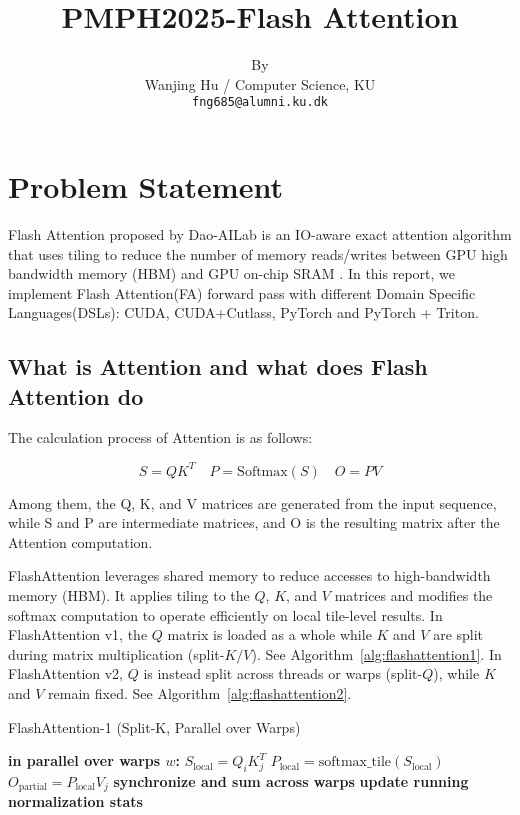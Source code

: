 \documentclass[11pt]{article}
\title{PMPH2025-Flash Attention}
\author{By \\
  Wanjing Hu / Computer Science, KU  \\
  \texttt{fng685@alumni.ku.dk} \\}
\renewcommand\cite{\citep}  %
\begin{document}
\maketitle

\section{Problem Statement}

Flash Attention proposed by Dao-AILab is an IO-aware exact attention algorithm that uses tiling to reduce the number of memory reads/writes between GPU high bandwidth memory (HBM) and GPU on-chip SRAM\cite{dao2022flashattention} \cite{dao2023flashattention}. In this report, we implement Flash Attention(FA) forward pass with different Domain Specific Languages(DSLs): CUDA, CUDA+Cutlass, PyTorch and PyTorch + Triton.

\subsection{What is Attention and what does Flash Attention do}
The calculation process of Attention is as follows:

\[
S = QK^{T} \quad P = \text{Softmax}(S) \quad O = PV
\]

Among them, the Q, K, and V matrices are generated from the input sequence, while S and P are intermediate matrices, and O is the resulting matrix after the Attention computation.

FlashAttention leverages shared memory to reduce accesses to high-bandwidth memory (HBM). It applies tiling to the $Q$, $K$, and $V$ matrices and modifies the softmax computation to operate efficiently on local tile-level results. In FlashAttention v1, the $Q$ matrix is loaded as a whole while $K$ and $V$ are split  during matrix multiplication (split-$K/V$). See Algorithm~\ref{alg:flashattention1}. In FlashAttention v2, $Q$ is instead split across threads or warps (split-$Q$), while $K$ and $V$ remain fixed. See Algorithm~\ref{alg:flashattention2}.

\begin{algorithm}[htbp]
\caption{FlashAttention-1 (Split-K, Parallel over Warps)}
\begin{algorithmic}[1]
    \STATE \textbf{in parallel over warps $w$:} 
    \STATE \hspace{0.5cm} $S_{\text{local}} = Q_i K_j^{T}$ 
    \STATE \hspace{0.5cm} $P_{\text{local}} = \text{softmax\_tile}(S_{\text{local}})$ 
    \STATE \hspace{0.5cm} $O_{\text{partial}} = P_{\text{local}} V_j$ 
    \STATE \textbf{synchronize and sum across warps} 
    \STATE \textbf{update running normalization stats} 
\ENDFOR
\end{algorithmic}
\end{algorithm}
\end{document}
